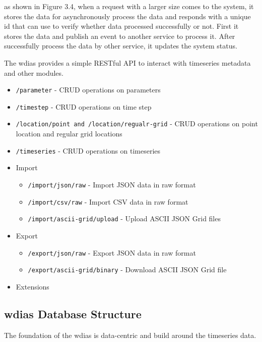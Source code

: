 \documentclass[conference]{IEEEtran}
\begin{document}
as shown in Figure 3.4, when a request
with a larger size comes to the system, it stores the data for asynchronously process
the data and responds with a unique id that can use to verify whether data processed
successfully or not. First it stores the data and publish an event to another service to process it. After successfully process the data by other service, it updates the system status.

The \acrshort{wdias} provides a simple RESTful API to interact with timeseries metadata and other modules.
\begin{itemize}
    \item \texttt{/parameter} - CRUD operations on parameters
    \item \texttt{/timestep} - CRUD operations on time step
    \item \texttt{/location/point and /location/regualr-grid} - CRUD operations on point location and regular grid locations
    \item \texttt{/timeseries} - CRUD operations on timeseries
    \item Import
    \begin{itemize}
        \item \texttt{/import/json/raw} - Import JSON data in raw format
        \item \texttt{/import/csv/raw} - Import CSV data in raw format
        \item \texttt{/import/ascii-grid/upload} - Upload ASCII JSON Grid files
    \end{itemize}
    \item Export
    \begin{itemize}
        \item \texttt{/export/json/raw} - Export JSON data in raw format
        \item \texttt{/export/ascii-grid/binary} - Download ASCII JSON Grid file
    \end{itemize}
    \item Extensions
\end{itemize}

\subsection{\acrshort{wdias} Database Structure}
\label{subse:wdias_database}

The foundation of the \acrshort{wdias} is data-centric and build around the timeseries data.
\end{document}
